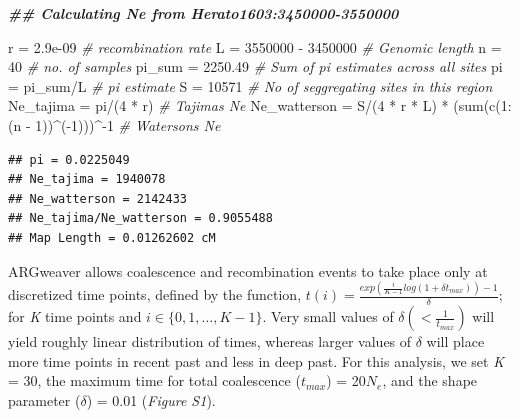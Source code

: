 \documentclass[
]{article}
\newenvironment{Shaded}{\begin{snugshade}}{\end{snugshade}}
\newcommand{\CommentTok}[1]{\textcolor[rgb]{0.56,0.35,0.01}{\textit{#1}}}
\newcommand{\DecValTok}[1]{\textcolor[rgb]{0.00,0.00,0.81}{#1}}
\newcommand{\DocumentationTok}[1]{\textcolor[rgb]{0.56,0.35,0.01}{\textbf{\textit{#1}}}}
\newcommand{\FloatTok}[1]{\textcolor[rgb]{0.00,0.00,0.81}{#1}}
\newcommand{\FunctionTok}[1]{\textcolor[rgb]{0.00,0.00,0.00}{#1}}
\newcommand{\NormalTok}[1]{#1}
\newcommand{\OtherTok}[1]{\textcolor[rgb]{0.56,0.35,0.01}{#1}}
\newcommand{\SpecialCharTok}[1]{\textcolor[rgb]{0.00,0.00,0.00}{#1}}
\begin{document}
\begin{Shaded}
\begin{Highlighting}[]
\DocumentationTok{\#\# Calculating Ne from Herato1603:3450000{-}3550000}

\NormalTok{r }\OtherTok{=} \FloatTok{2.9e{-}09}  \CommentTok{\# recombination rate}
\NormalTok{L }\OtherTok{=} \DecValTok{3550000} \SpecialCharTok{{-}} \DecValTok{3450000}  \CommentTok{\# Genomic length}
\NormalTok{n }\OtherTok{=} \DecValTok{40}  \CommentTok{\# no. of samples}
\NormalTok{pi\_sum }\OtherTok{=} \FloatTok{2250.49}  \CommentTok{\# Sum of pi estimates across all sites}
\NormalTok{pi }\OtherTok{=}\NormalTok{ pi\_sum}\SpecialCharTok{/}\NormalTok{L  }\CommentTok{\# pi estimate}
\NormalTok{S }\OtherTok{=} \DecValTok{10571}  \CommentTok{\# No of seggregating sites in this region }
\NormalTok{Ne\_tajima }\OtherTok{=}\NormalTok{ pi}\SpecialCharTok{/}\NormalTok{(}\DecValTok{4} \SpecialCharTok{*}\NormalTok{ r)  }\CommentTok{\# Tajima\textquotesingle{}s Ne}
\NormalTok{Ne\_watterson }\OtherTok{=}\NormalTok{ S}\SpecialCharTok{/}\NormalTok{(}\DecValTok{4} \SpecialCharTok{*}\NormalTok{ r }\SpecialCharTok{*}\NormalTok{ L) }\SpecialCharTok{*}\NormalTok{ (}\FunctionTok{sum}\NormalTok{(}\FunctionTok{c}\NormalTok{(}\DecValTok{1}\SpecialCharTok{:}\NormalTok{(n }\SpecialCharTok{{-}} \DecValTok{1}\NormalTok{))}\SpecialCharTok{\^{}}\NormalTok{(}\SpecialCharTok{{-}}\DecValTok{1}\NormalTok{)))}\SpecialCharTok{\^{}{-}}\DecValTok{1}  \CommentTok{\# Waterson\textquotesingle{}s Ne}
\end{Highlighting}
\end{Shaded}

\begin{verbatim}
## pi = 0.0225049 
## Ne_tajima = 1940078 
## Ne_watterson = 2142433 
## Ne_tajima/Ne_watterson = 0.9055488
## Map Length = 0.01262602 cM
\end{verbatim}

ARGweaver allows coalescence and recombination events to take place only at discretized time points, defined by the function, \(t(i)=\frac {exp(\frac{ i}{K−1}log(1+\delta t_{max}))−1}{\delta}\); for \emph{K} time points and \(i\in{\{0, 1, …, K−1\}}\). Very small values of \(\delta ( <\frac {1}{t_{max}})\) will yield roughly linear
distribution of times, whereas larger values of \(\delta\) will place
more time points in recent past and less in deep past. For this
analysis, we set \emph{K} = 30, the maximum time for total coalescence
(\(t_{max}\)) = 20\(N_e\), and the shape parameter (\(\delta\)) = 0.01
(\emph{Figure S1}).
\end{document}
